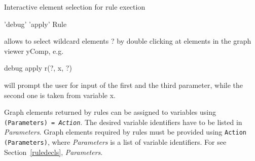 Interactive element selection for rule exection
\begin{rail}
'debug' 'apply' Rule
\end{rail}
allows to select wildcard elements ? by double clicking at elements in the graph viewer yComp, e.g.
\begin{grshelllet}
debug apply r(?, x, ?)
\end{grshelllet}
will prompt the user for input of the first and the third parameter, while the second one is taken from variable x.

Graph elements returned by rules can be assigned to variables using \texttt{(Para\-meters) = \emph{Action}}. 
The desired variable identifiers have to be listed in \emph{Parameters}. 
Graph elements required by rules must be provided using \texttt{Action (Para\-meters)}, where \emph{Parameters} is a list of variable identifiers. 
For  see Section~\ref{ruledecls}, \emph{Parameters}.


